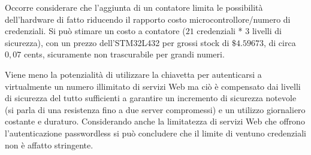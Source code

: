 Occorre considerare che l'aggiunta di un contatore limita le possibilità dell'hardware di fatto riducendo il rapporto costo microcontrollore/numero di credenziali. Si può stimare un costo a contatore ($21$ credenziali * $ 3$ livelli di sicurezza), con un prezzo dell'STM32L432 per grossi stock di $\$4.59673$, di circa $0,07$ cents, sicuramente non trascurabile per grandi numeri.

Viene meno la potenzialità di utilizzare la chiavetta per autenticarsi a virtualmente un numero illimitato di servizi Web ma ciò è compensato dai livelli di sicurezza del tutto sufficienti a garantire un incremento di sicurezza notevole (si parla di una resistenza fino a due server compromessi) e un utilizzo giornaliero costante e duraturo. Considerando anche la limitatezza di servizi Web che offrono l'autenticazione passwordless si può concludere che il limite di ventuno credenziali non è affatto stringente. 